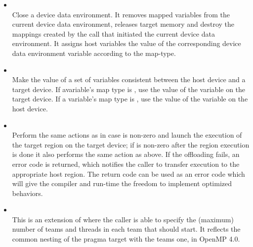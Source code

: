 \begin{itemize}
  \item {}\\

    Close a device data environment. It removes mapped variables from the current device data environment, releases target memory and destroy the mappings created by the  call that initiated the current device data environment. It assigns host variables the value of the corresponding device data environment variable according to the map-type.

  \item {}\\

    Make the value of a set of variables consistent between the host device and a target device. If avariable’s map type is \mfrom{}, use the value of the variable on the target device. If a variable’s map type is \mto{}, use the value of the variable on the host device.
    
  \item {}\\

    Perform the same actions as  in case  is non-zero and launch the execution of the target region on the target device; if  is non-zero after the region execution is done it also performs the same action as  above. If the offloading fails, an error code is returned, which notifies the caller to transfer execution to the appropriate host region. The return code can be used as an error code which will give the compiler and run-time the freedom to implement optimized behaviors.

  \item {}\\

    This is an extension of  where the caller is able to specify the (maximum) number of teams and threads in each team that \libomptarget{} should start. It reflects the common nesting of the pragma target with the teams one, in OpenMP 4.0. 

\end{itemize}

